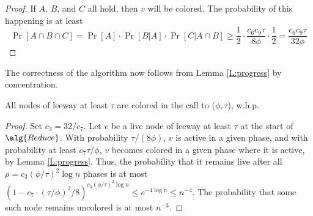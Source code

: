 \begin{proof}
If $A$, $B$, and $C$ all hold, then $v$ will be colored. 
The probability of this happening is at least 
\[ \Pr[A \cap B \cap C] = \Pr[A] \cdot \Pr[B | A] \cdot \Pr[C | A \cap B] \ge \frac{1}{2}\cdot \frac{c_6c_9 \tau}{8\phi} \cdot \frac{1}{2} = \frac{c_6c_9\tau}{32\phi} \]
\end{proof}

The correctness of the algorithm now follows from Lemma \ref{L:progress} by concentration.

\begin{theorem}
All nodes of leeway at least $\tau$ are colored in the call to ($\phi,\tau$), w.h.p.
\label{T:reduce-correct}
\end{theorem}

\begin{proof}
Set $c_3 = 32/c_7$. 
Let $v$ be a live node of leeway at least $\tau$ at the start of $\alg{Reduce}$.
With probability $\tau/(8\phi)$, $v$ is active in a given phase, and with
probability at least $c_7 \tau/\phi$, $v$ becomes colored in a given phase where it is active, by Lemma \ref{L:progress}. Thus, the probability that it remains live after all $\rho = c_3 (\phi/\tau)^2 \log n$ phases is at most 
$(1-c_7\cdot(\tau/\phi)^2/8)^{c_3 (\phi/\tau)^2 \log n} \le e^{-4\log n} \le n^{-4}$.
The probability that some such node remains uncolored is at most $n^{-3}$.
\end{proof}

\iffalse %
\begin{proof}
Let $v$ be a node of leeway at least $\tau$ that is live at the start of \alg{Reduce}($\phi,\tau$).
Let $N'_v$ be the set of nodes in $\hat{H}[v]$ that have a single 2-path to $v$, and recall that by Lemma \ref{L:H-neighbors}(1), $|N'_v| \ge \Delta^2/2$.
The number of queries sent from $v$ and not dropped is expected $|N'(v)|/\tau \cdot \log n \ge (\Delta^2 \log n)/(2\tau)$, and by Chernoff at least $(\Delta^2\log n)/(4\tau)$, with probability at least $1-n^2$, since $\tau \le \Delta^2/16$.  
Each succeeds independently with probability at least $\tau/(4\Delta^2)$, by Lemma \ref{L:progress}. 
The probability that none of them succeed is at most
\[ (1 - \tau/(8\Delta^2))^{\Delta^2 \log n)/(2\tau)} \le e^{-1/16 \cdot \log n} \le n^{-1/16} \ . \]
The probability that some node remains live after \alg{Reduce}($\phi,\tau$) is at most $n^{-1/16+1}$.
Setting $c_5 \ge 48$ ensures that this occurs with probability at most $1/n^2$.
\end{proof}
\fi %



